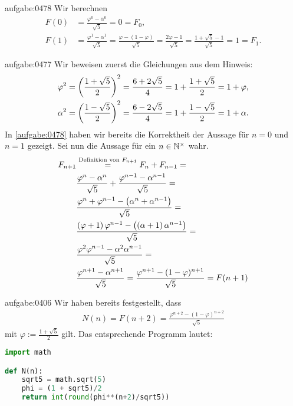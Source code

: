 \begin{antwort}{aufgabe:0478}
Wir berechnen
\begin{align*}
    F(0) &= \frac{\varphi^0-\alpha^0}{\sqrt{5}} = 0 = F_0, \\
    F(1) &= \frac{\varphi^1-\alpha^1}{\sqrt{5}} = \frac{\varphi-(1-\varphi)}{\sqrt{5}} = \frac{2\varphi-1}{\sqrt{5}} = \frac{1+\sqrt{5}-1}{\sqrt{5}} = 1 = F_1.
\end{align*}
\end{antwort}


\begin{antwort}{aufgabe:0477}
Wir beweisen zuerst die Gleichungen aus dem Hinweis:
\begin{align*}
    \varphi^2 &= \left(\frac{1+\sqrt{5}}{2}\right)^2 = \frac{6+2\sqrt{5}}{4} = 1 + \frac{1+\sqrt{5}}{2} = 1 + \varphi, \\
    \alpha^2 &= \left(\frac{1-\sqrt{5}}{2}\right)^2 = \frac{6-2\sqrt{5}}{4} = 1 + \frac{1-\sqrt{5}}{2} = 1 + \alpha.
\end{align*}
In \cref{aufgabe:0478} haben wir bereits die Korrektheit der Aussage für $n=0$ und $n=1$ gezeigt. Sei nun die Aussage für ein $n\in\mathbb{N}^{\times}$ wahr.
\begin{align*}
    F_{n+1} & \stackrel{\text{Definition von $F_{n+1}$}}{=} F_n + F_{n-1} = \\
    &\frac{\varphi^{n}-\alpha^{n}}{\sqrt{5}} + \frac{\varphi^{n-1}-\alpha^{n-1}}{\sqrt{5}} = \\
    &\frac{\varphi^{n} + \varphi^{n-1} - \left(\alpha^{n}+\alpha^{n-1}\right)}{\sqrt{5}} = \\
    &\frac{\left(\varphi + 1\right)\varphi^{n-1} - \left(\left(\alpha + 1\right)\alpha^{n-1}\right)}{\sqrt{5}} = \\
    &\frac{\varphi^2\varphi^{n-1} - \alpha^2\alpha^{n-1}}{\sqrt{5}} = \\
    &\frac{\varphi^{n+1}-\alpha^{n+1}}{\sqrt{5}} = \frac{\varphi^{n+1}-(1-\varphi)^{n+1}}{\sqrt{5}} = F(n+1)
\end{align*}
\end{antwort}


\begin{antwort}{aufgabe:0406}
Wir haben bereits festgestellt, dass
\begin{align*}
    N(n) = F(n+2) = \frac{\varphi^{n+2}-(1-\varphi)^{n+2}}{\sqrt{5}}
\end{align*}
mit $\varphi := \frac{1+\sqrt{5}}{2}$ gilt. Das entsprechende Programm lautet:
\begin{lstlisting}[language=Python]
import math

def N(n):
    sqrt5 = math.sqrt(5)
    phi = (1 + sqrt5)/2
    return int(round(phi**(n+2)/sqrt5))
\end{lstlisting}
\end{antwort}


\clearpage
\shipoutAnswer